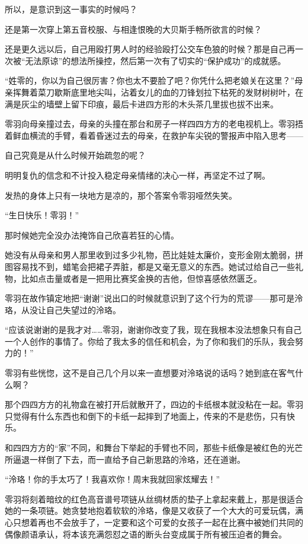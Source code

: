 \documentclass[UTF8, scheme = chinese, openany]{ctexbook}
\begin{document}
所以，是意识到这一事实的时候吗？

还是第一次穿上第五音校服、与相逢恨晚的大贝斯手畅所欲言的时候？

还是更久远以后，自己用殴打男人时的经验殴打公交车色狼的时候？那是自己再一次被“无法原谅”的想法所操控，然后第一次有了切实的“保护成功”的成就感。

“姓零的，你以为自己很厉害？你也太不要脸了吧？你凭什么把老娘关在这里？”母亲挥舞着菜刀歇斯底里地尖叫，沾着女儿的血的刀锋划拉下枯死的发财树树叶，在满是灰尘的墙壁上留下印痕，最后卡进四方形的木头茶几里拔也拔不出来。

零羽向母亲撞过去，母亲的头撞在那台和房子一样四四方方的老电视机上。零羽捂着鲜血横流的手臂，看着昏迷过去的母亲，在救护车尖锐的警报声中陷入思考——

自己究竟是从什么时候开始疏忽的呢？

明明复仇的信念和不计投入稳定母亲情绪的决心一样，再坚定不过了啊。

发热的身体上只有一块地方是凉的，那个答案令零羽哑然失笑。

“生日快乐！零羽！”

那时候她完全没办法掩饰自己欣喜若狂的心情。

她没有从母亲和男人那里收到过多少礼物，芭比娃娃太廉价，变形金刚太脆弱，拼图容易找不到，蜡笔会把裙子弄脏，都是又毫无意义的东西。她试过给自己一些礼物，比如点击量或者是一把用比赛奖金换的吉他，但惊喜感依然匮乏。

零羽在故作镇定地把“谢谢”说出口的时候就意识到了这个行为的荒谬——那可是泠珞，从没让自己失望过的泠珞。

“应该说谢谢的是我才对……零羽，谢谢你改变了我，现在我根本没法想象只有自己一个人创作的事情了。你给了我太多的信任和机会，为了你和我们的乐队，我会努力的！”

零羽有些恍惚，这不是自己几个月以来一直想要对泠珞说的话吗？她到底在客气什么啊？

那个四四方方的礼物盒在被打开后就散开了，四边的卡纸根本就没粘在一起。零羽只觉得有什么东西也和倒下的卡纸一起摔到了地面上，传来的不是悲伤，只有快乐。

和四四方方的“家”不同，和舞台下举起的手臂也不同，那些卡纸像是被红色的光芒所逼退一样倒了下去，而一直给予自己新思路的泠珞，还在道谢。

“泠珞！你的手太巧了！我喜欢你！周末我就回家炫耀去！”

零羽将刻着暗纹的红色高音谱号项链从丝绸材质的垫子上拿起来戴上，那是很适合她的一条项链。她贪婪地抱着软软的泠珞，像是又收获了一个大大的可爱玩偶，满心只想着再也不会放手了，一定要和这个可爱的女孩子一起在比赛中被她们共同的偶像颜语承认，将本该充满怨怼之语的断头台变成属于所有被压迫者的舞会。
\end{document}
